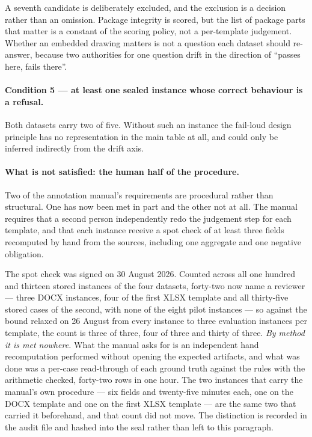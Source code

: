 A seventh candidate is deliberately excluded, and the exclusion is a decision rather than an
omission. Package integrity is scored, but the list of package parts that matter is a constant
of the scoring policy, not a per-template judgement. Whether an embedded drawing matters is not
a question each dataset should re-answer, because two authorities for one question drift in the
direction of ``passes here, fails there''.

\paragraph{Condition 5 --- at least one sealed instance whose correct behaviour is a refusal.}
Both datasets carry two of five. Without such an instance the fail-loud design principle has no
representation in the main table at all, and could only be inferred indirectly from the drift
axis.

\paragraph{What is not satisfied: the human half of the procedure.}
Two of the annotation manual's requirements are procedural rather than structural. One has
now been met in part and the other not at all. The manual requires that a second person
independently redo the judgement step for each template, and that each instance receive a
spot check of at least three fields recomputed by hand from the sources, including one
aggregate and one negative obligation.

The spot check was signed on 30 August 2026. Counted across all one hundred and thirteen
stored instances of the four datasets, forty-two now name a reviewer --- three DOCX
instances, four of the first XLSX template and all thirty-five stored cases of the second,
with none of the eight pilot instances --- so against the bound relaxed on 26 August from
every instance to three evaluation instances per template, the count is three of three, four
of three and thirty of three. \emph{By method it is met nowhere.} What the manual asks for is
an independent hand recomputation performed without opening the expected artifacts, and what
was done was a per-case read-through of each ground truth against the rules with the
arithmetic checked, forty-two rows in one hour. The two instances that carry the manual's own
procedure --- six fields and twenty-five minutes each, one on the DOCX template and one on
the first XLSX template --- are the same two that carried it beforehand, and that count did
not move. The distinction is recorded in the audit file and hashed into the seal rather than
left to this paragraph.

